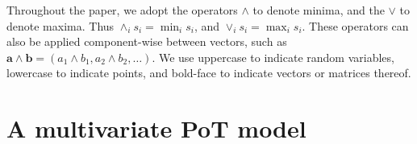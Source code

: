Throughout the paper, we adopt the operators $\wedge$ to denote minima, and 
    the $\vee$ to denote maxima.  Thus $\wedge_i s_i = \min_i s_i$, and $\vee_i s_i = \max_i s_i$.  
    These operators can also be applied component-wise between vectors, such as
    $\bm{a}\wedge\bm{b} = (a_1\wedge b_1, a_2\wedge b_2,\ldots)$.  We use 
    uppercase to indicate random variables, lowercase to indicate points, and
    bold-face to indicate vectors or matrices thereof.
  
\section{A multivariate PoT model\label{sec:multivariatepot}}


